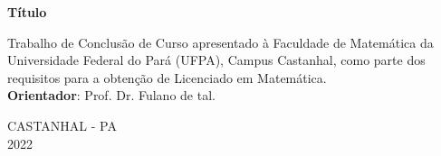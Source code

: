 \newpage
\begin{center}
	
	\vspace{4cm}
	
	{\Large{\textbf{\singlespacing Título}}}
\end{center}

\vspace{4cm}

\begin{flushright}
	\begin{minipage}{.5 \linewidth}
		\singlespacing
		Trabalho de Conclusão de Curso apresentado
		à Faculdade de Matemática da Universidade
		Federal do Pará (UFPA), Campus Castanhal,
		como parte dos requisitos para a obtenção de
		Licenciado em \mbox{Matemática}. \\
		\textbf{Orientador}: Prof. Dr. Fulano de tal.
	\end{minipage}
\end{flushright}

\vspace{7cm}


\begin{center}
	\large{\normalsize CASTANHAL - PA\\}
	{\normalsize 2022}
\end{center}